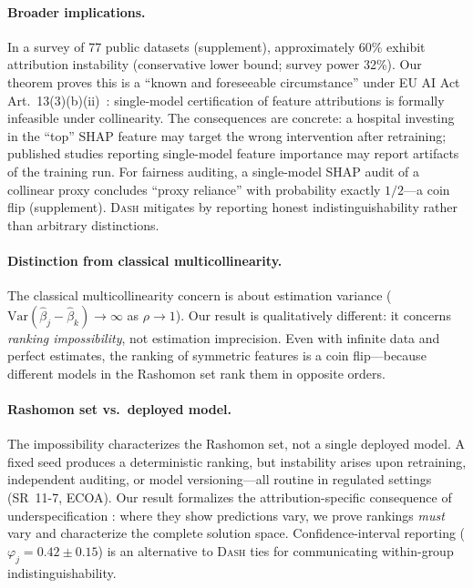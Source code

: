 \documentclass{article}
\newcommand{\Var}{\mathrm{Var}}
\newcommand{\DASH}{\textsc{Dash}}
\begin{document}

\paragraph{Broader implications.}
In a survey of 77 public datasets (supplement), approximately 60\% exhibit attribution instability (conservative lower bound; survey power 32\%).
Our theorem proves this is a ``known and foreseeable circumstance'' under EU AI Act Art.~13(3)(b)(ii)~\citep{euaiact2024}: single-model certification of feature attributions is formally infeasible under collinearity.
The consequences are concrete: a hospital investing in the ``top'' SHAP feature may target the wrong intervention after retraining; published studies reporting single-model feature importance may report artifacts of the training run.
For fairness auditing, a single-model SHAP audit of a collinear proxy concludes ``proxy reliance'' with probability exactly $1/2$---a coin flip (supplement).
\DASH{} mitigates by reporting honest indistinguishability rather than arbitrary distinctions.

\paragraph{Distinction from classical multicollinearity.}
The classical multicollinearity concern is about estimation variance ($\Var(\hat\beta_j - \hat\beta_k) \to \infty$ as $\rho \to 1$). Our result is qualitatively different: it concerns \emph{ranking impossibility}, not estimation imprecision. Even with infinite data and perfect estimates, the ranking of symmetric features is a coin flip---because different models in the Rashomon set rank them in opposite orders.

\paragraph{Rashomon set vs.\ deployed model.}
The impossibility characterizes the Rashomon set, not a single deployed model.
A fixed seed produces a deterministic ranking, but instability arises upon retraining, independent auditing, or model versioning---all routine in regulated settings (SR~11-7, ECOA).
Our result formalizes the attribution-specific consequence of underspecification \citep{damour2022underspecification}: where they show predictions vary, we prove rankings \emph{must} vary and characterize the complete solution space.
Confidence-interval reporting ($\varphi_j = 0.42 \pm 0.15$) is an alternative to \DASH{} ties for communicating within-group indistinguishability.
\end{document}

